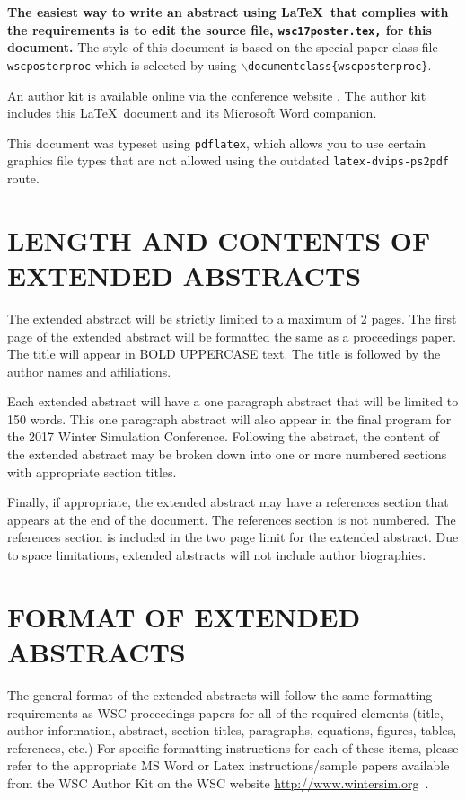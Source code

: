 \documentclass{wscposterproc}
\begin{document}
\textbf{The easiest way to write an abstract using \LaTeX\ that complies with the
requirements is to edit the source file, {\tt wsc17poster.tex,} for this document.}
The style of this document is based on the special paper class file {\tt wscposterproc} which is selected by using {\tt $\backslash$documentclass\{wscposterproc\}}.

An author kit is available online via the  \href{http://www.wintersim.org}%
{conference website} \cite{WSC}.
The author kit includes this \LaTeX\ document and its Microsoft Word companion.

This document was typeset using {\tt pdflatex}, which allows you to use certain
graphics file types that are not allowed using the outdated {\tt latex-dvips-ps2pdf} route.

\section{LENGTH AND CONTENTS OF EXTENDED ABSTRACTS}
The extended abstract will be strictly limited to a maximum  of 2 pages. The first page of the extended abstract will be formatted the same as a proceedings paper. The title will appear in BOLD UPPERCASE text. The title is followed by the author names and affiliations.

Each extended abstract will have a one paragraph abstract that will be limited to 150 words. This one paragraph abstract will also appear in the final program for the 2017 Winter Simulation Conference. Following the abstract, the content of the extended abstract may be broken down into one or more numbered sections with appropriate section titles.

Finally, if appropriate, the extended abstract may have a references section that appears at the end of the document. The references section is not numbered. The references section is included in the two page limit for the extended abstract. Due to space limitations, extended abstracts will not include author biographies.

\section{FORMAT OF EXTENDED ABSTRACTS}

The general format of the extended abstracts will follow the same formatting requirements as WSC proceedings papers for all of the required elements (title, author information, abstract, section titles, paragraphs, equations, figures, tables, references, etc.) For specific formatting instructions for each of these items, please refer to the appropriate MS Word or Latex instructions/sample papers available from the WSC Author Kit on the WSC website \url{http://www.wintersim.org}~\cite{WSC}.
\end{document}
